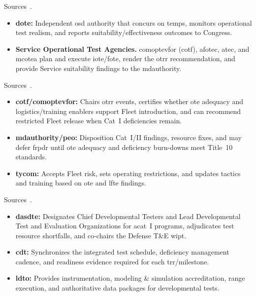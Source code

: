 \documentclass[../main.tex]{subfiles}
\begin{document}
\begin{description}[style=nextline, labelsep=0.5em, font=\bfseries]
  \item[\textbf{Operational test oversight.}]
        Sources~\autocite{DoDI5000-85,DoDAcqGuidebook}.
        \begin{itemize}
          \item \textbf{\ac{dote}:} Independent \ac{osd} authority that concurs on \ac{temp}s, monitors operational test realism, and reports suitability/effectiveness outcomes to Congress.
          \item \textbf{Service Operational Test Agencies.} \ac{comoptevfor} (\acs{cotf}), \ac{afotec}, \ac{atec}, and \ac{mcotea} plan and execute \ac{iote}/\ac{fote}, render the \ac{otrr} recommendation, and provide Service suitability findings to the \ac{mdauthority}.
        \end{itemize}
  \item[\textbf{Operational test readiness and fleet release.}]
        Sources~\autocite{edo-3-5-6-test-eval-part-ii-2025,DoDI5000-89}.
        \begin{itemize}
          \item \textbf{\ac{cotf}/\ac{comoptevfor}:} Chairs \ac{otrr} events, certifies whether \ac{ote} adequacy and logistics/training enablers support Fleet introduction, and can recommend restricted Fleet release when Cat~I deficiencies remain.
          \item \textbf{\ac{mdauthority}/\ac{peo}:} Disposition Cat~I/II findings, resource fixes, and may defer \ac{frpdr} until \ac{ote} adequacy and deficiency burn-downs meet Title~10 standards.
          \item \textbf{\ac{tycom}:} Accepts Fleet risk, sets operating restrictions, and updates tactics and training based on \ac{ote} and \ac{lfte} findings.
        \end{itemize}
  \item[\textbf{Developmental test governance.}]
        Sources~\autocite{DoDI5000-89}.
        \begin{itemize}
\item \textbf{\ac{dasdte}:} Designates Chief Developmental Testers and Lead Developmental Test and Evaluation Organizations for \ac{acat}~I programs, adjudicates test resource shortfalls, and co-chairs the Defense T\&E \ac{wipt}.
          \item \textbf{\ac{cdt}:} Synchronizes the integrated test schedule, deficiency management cadence, and readiness evidence required for each \ac{trr}/milestone.
          \item \textbf{\ac{ldto}:} Provides instrumentation, modeling \& simulation accreditation, range execution, and authoritative data packages for developmental tests.

\end{itemize}
\end{description}
\end{document}

